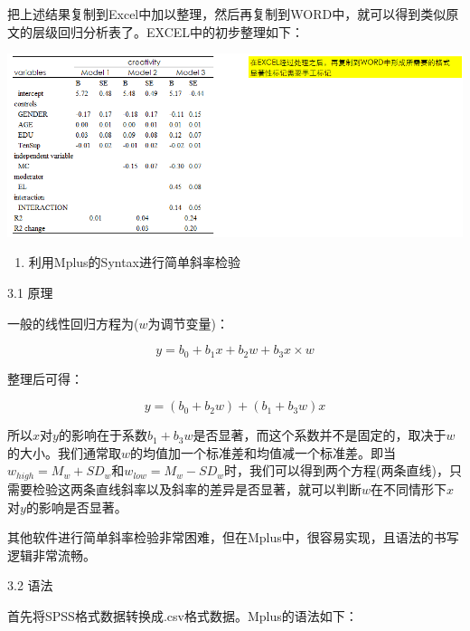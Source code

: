 \documentclass[
]{book}
\providecommand{\tightlist}{%
  \setlength{\itemsep}{0pt}\setlength{\parskip}{0pt}}
\begin{document}
把上述结果复制到Excel中加以整理，然后再复制到WORD中，就可以得到类似原文的层级回归分析表了。EXCEL中的初步整理如下：

\includegraphics{figs/13110.png}

\begin{enumerate}
\def\labelenumi{\arabic{enumi}.}
\setcounter{enumi}{2}
\tightlist
\item
  利用Mplus的Syntax进行简单斜率检验
\end{enumerate}

3.1 原理

一般的线性回归方程为(\(w\)为调节变量)：

\[
y=b_{0}+b_{1}x+b_{2}w+b_{3}x{\times}w
\]

整理后可得：

\[
y=(b_{0}+b_{2}w)+(b_{1}+b_{3}w)x
\]

所以\(x\)对\(y\)的影响在于系数\(b_{1}+b_{3}w\)是否显著，而这个系数并不是固定的，取决于\(w\)的大小。我们通常取\(w\)的均值加一个标准差和均值减一个标准差。即当\(w_{high}=M_{w}+SD_{w}\)和\(w_{low}=M_{w}-SD_{w}\)时，我们可以得到两个方程(两条直线)，只需要检验这两条直线斜率以及斜率的差异是否显著，就可以判断\(w\)在不同情形下\(x\)对\(y\)的影响是否显著。

其他软件进行简单斜率检验非常困难，但在Mplus中，很容易实现，且语法的书写逻辑非常流畅。

3.2 语法

首先将SPSS格式数据转换成.csv格式数据。Mplus的语法如下：
\end{document}
